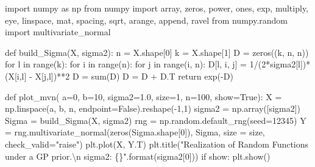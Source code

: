 \documentclass[
  letterpaper,
  DIV=11,
  numbers=noendperiod]{scrreprt}
\newenvironment{Shaded}{\begin{snugshade}}{\end{snugshade}}
\newcommand{\BuiltInTok}[1]{\textcolor[rgb]{0.00,0.23,0.31}{#1}}
\newcommand{\CharTok}[1]{\textcolor[rgb]{0.13,0.47,0.30}{#1}}
\newcommand{\ControlFlowTok}[1]{\textcolor[rgb]{0.00,0.23,0.31}{#1}}
\newcommand{\DecValTok}[1]{\textcolor[rgb]{0.68,0.00,0.00}{#1}}
\newcommand{\FloatTok}[1]{\textcolor[rgb]{0.68,0.00,0.00}{#1}}
\newcommand{\ImportTok}[1]{\textcolor[rgb]{0.00,0.46,0.62}{#1}}
\newcommand{\KeywordTok}[1]{\textcolor[rgb]{0.00,0.23,0.31}{#1}}
\newcommand{\NormalTok}[1]{\textcolor[rgb]{0.00,0.23,0.31}{#1}}
\newcommand{\OperatorTok}[1]{\textcolor[rgb]{0.37,0.37,0.37}{#1}}
\newcommand{\SpecialCharTok}[1]{\textcolor[rgb]{0.37,0.37,0.37}{#1}}
\newcommand{\StringTok}[1]{\textcolor[rgb]{0.13,0.47,0.30}{#1}}
\newcommand{\VariableTok}[1]{\textcolor[rgb]{0.07,0.07,0.07}{#1}}
\begin{document}
\begin{Shaded}
\begin{Highlighting}[]
\ImportTok{import}\NormalTok{ numpy }\ImportTok{as}\NormalTok{ np}
\ImportTok{from}\NormalTok{ numpy }\ImportTok{import}\NormalTok{ array, zeros, power, ones, exp, multiply, eye, linspace, mat, spacing, sqrt, arange, append, ravel}
\ImportTok{from}\NormalTok{ numpy.random }\ImportTok{import}\NormalTok{ multivariate\_normal}

\KeywordTok{def}\NormalTok{ build\_Sigma(X, sigma2):}
\NormalTok{    n }\OperatorTok{=}\NormalTok{ X.shape[}\DecValTok{0}\NormalTok{]}
\NormalTok{    k }\OperatorTok{=}\NormalTok{ X.shape[}\DecValTok{1}\NormalTok{]}
\NormalTok{    D }\OperatorTok{=}\NormalTok{ zeros((k, n, n))}
    \ControlFlowTok{for}\NormalTok{ l }\KeywordTok{in} \BuiltInTok{range}\NormalTok{(k):}
        \ControlFlowTok{for}\NormalTok{ i }\KeywordTok{in} \BuiltInTok{range}\NormalTok{(n):}
            \ControlFlowTok{for}\NormalTok{ j }\KeywordTok{in} \BuiltInTok{range}\NormalTok{(i, n):}
\NormalTok{                D[l, i, j] }\OperatorTok{=} \DecValTok{1}\OperatorTok{/}\NormalTok{(}\DecValTok{2}\OperatorTok{*}\NormalTok{sigma2[l])}\OperatorTok{*}\NormalTok{(X[i,l] }\OperatorTok{{-}}\NormalTok{ X[j,l])}\OperatorTok{**}\DecValTok{2}
\NormalTok{    D }\OperatorTok{=} \BuiltInTok{sum}\NormalTok{(D)}
\NormalTok{    D }\OperatorTok{=}\NormalTok{ D }\OperatorTok{+}\NormalTok{ D.T}
    \ControlFlowTok{return}\NormalTok{ exp(}\OperatorTok{{-}}\NormalTok{D)}

\KeywordTok{def}\NormalTok{ plot\_mvn( a}\OperatorTok{=}\DecValTok{0}\NormalTok{, b}\OperatorTok{=}\DecValTok{10}\NormalTok{, sigma2}\OperatorTok{=}\FloatTok{1.0}\NormalTok{, size}\OperatorTok{=}\DecValTok{1}\NormalTok{, n}\OperatorTok{=}\DecValTok{100}\NormalTok{, show}\OperatorTok{=}\VariableTok{True}\NormalTok{):    }
\NormalTok{    X }\OperatorTok{=}\NormalTok{ np.linspace(a, b, n, endpoint}\OperatorTok{=}\VariableTok{False}\NormalTok{).reshape(}\OperatorTok{{-}}\DecValTok{1}\NormalTok{,}\DecValTok{1}\NormalTok{)}
\NormalTok{    sigma2 }\OperatorTok{=}\NormalTok{ np.array([sigma2])}
\NormalTok{    Sigma }\OperatorTok{=}\NormalTok{ build\_Sigma(X, sigma2)}
\NormalTok{    rng }\OperatorTok{=}\NormalTok{ np.random.default\_rng(seed}\OperatorTok{=}\DecValTok{12345}\NormalTok{)}
\NormalTok{    Y }\OperatorTok{=}\NormalTok{ rng.multivariate\_normal(zeros(Sigma.shape[}\DecValTok{0}\NormalTok{]), Sigma, size }\OperatorTok{=}\NormalTok{ size, check\_valid}\OperatorTok{=}\StringTok{"raise"}\NormalTok{)}
\NormalTok{    plt.plot(X, Y.T)}
\NormalTok{    plt.title(}\StringTok{"Realization of Random Functions under a GP prior.}\CharTok{\textbackslash{}n}\StringTok{ sigma2: }\SpecialCharTok{\{\}}\StringTok{"}\NormalTok{.}\BuiltInTok{format}\NormalTok{(sigma2[}\DecValTok{0}\NormalTok{]))}
    \ControlFlowTok{if}\NormalTok{ show:}
\NormalTok{        plt.show()}
\end{Highlighting}
\end{Shaded}
\end{document}
